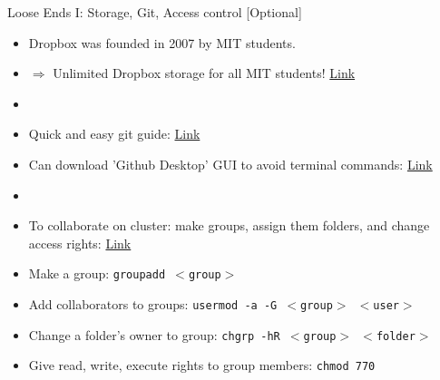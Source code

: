 \documentclass{beamer}
\begin{document}

\begin{frame}{Loose Ends I: Storage, Git, Access control [Optional]}
    \begin{itemize}
        \item Dropbox was founded in 2007 by MIT students.
        \item $\Rightarrow$ Unlimited Dropbox storage for all MIT students! \href{https://ist.mit.edu/dropbox}{Link}
        \item[]
        \item Quick and easy git guide: \href{http://rogerdudler.github.io/git-guide/}{Link}
        \item Can download 'Github Desktop' GUI to avoid terminal commands: \href{https://desktop.github.com/}{Link}
        \item[] 
        \item To collaborate on cluster: make groups, assign them folders, and change access rights: \href{https://ss64.com/bash/chmod.html}{Link}
        \item Make a group: \texttt{groupadd $<$group$>$}
        \item Add collaborators to groups: \texttt{usermod -a -G $<$group$>$ $<$user$>$}
        \item Change a folder's owner to group: \texttt{chgrp -hR $<$group$>$ $<$folder$>$}
        \item Give read, write, execute rights to group members: \texttt{chmod 770}
    \end{itemize}
\end{frame}
\end{document}
